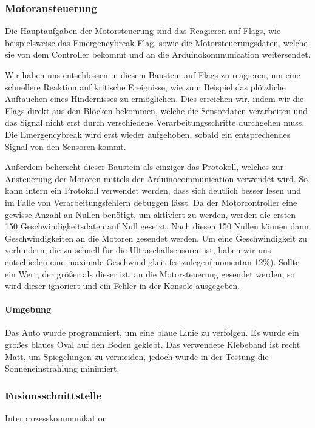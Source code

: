 \documentclass[12pt, a4paper]{scrartcl}
\begin{document}
\newpage
\subsubsection{Motoransteuerung}
Die Hauptaufgaben der Motorsteuerung sind das Reagieren auf Flags, wie beispielsweise das Emergencybreak-Flag, sowie die Motorsteuerungsdaten, welche sie von dem Controller bekommt und an die Arduinokommunication weitersendet.

Wir haben uns entschlossen in diesem Baustein auf Flags zu reagieren, um eine schnellere Reaktion auf kritische Ereignisse, wie zum Beispiel das plötzliche Auftauchen eines Hindernisses zu ermöglichen. Dies erreichen wir, indem wir die Flags direkt aus den Blöcken bekommen, welche die Sensordaten verarbeiten und das Signal nicht erst durch verschiedene Verarbeitungsschritte durchgehen muss. Die Emergencybreak wird erst wieder aufgehoben, sobald ein entsprechendes Signal von den Sensoren kommt.

Außerdem beherscht dieser Baustein als einziger das Protokoll, welches zur Ansteuerung der Motoren mittels der Arduinocommunication verwendet wird. So kann intern ein Protokoll verwendet werden, dass sich deutlich besser lesen und im Falle von Verarbeitungsfehlern debuggen lässt. Da der Motorcontroller eine gewisse Anzahl an Nullen benötigt, um aktiviert zu werden, werden die ersten 150 Geschwindigkeitsdaten auf Null gesetzt. Nach diesen 150 Nullen können dann Geschwindigkeiten an die Motoren gesendet werden. Um eine Geschwindigkeit zu verhindern, die zu schnell für die Ultraschallsensoren ist, haben wir uns entschieden eine maximale Geschwindigkeit festzulegen(momentan 12\%). Sollte ein Wert, der größer als dieser ist, an die Motorsteuerung gesendet werden, so wird dieser ignoriert und ein Fehler in der Konsole ausgegeben.

\paragraph{Umgebung}
Das Auto wurde programmiert, um eine blaue Linie zu verfolgen. Es wurde ein großes blaues Oval auf den Boden geklebt. Das verwendete Klebeband ist recht Matt, um Spiegelungen zu vermeiden, jedoch wurde in der Testung die Sonneneinstrahlung minimiert.


\subsubsection{Fusionsschnittstelle}
Interprozesskommunikation
\end{document}
